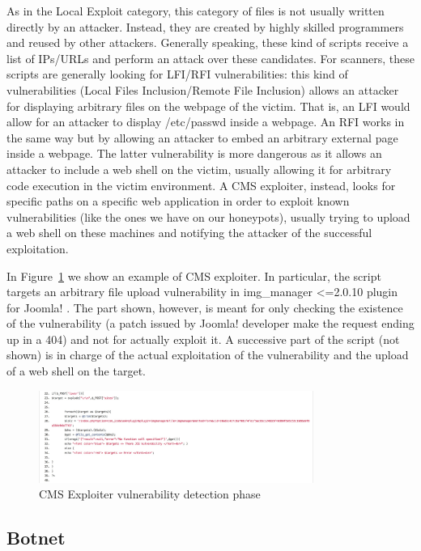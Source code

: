 As in the Local Exploit category, this category of files is not usually written directly by an attacker. Instead, they are created by highly skilled programmers and reused by other attackers. Generally speaking, these kind of scripts receive a list of IPs/URLs and perform an attack over these candidates.
For scanners, these scripts are generally looking for LFI/RFI vulnerabilities: this kind of vulnerabilities (Local Files Inclusion/Remote File Inclusion) allows an attacker for displaying arbitrary files on the webpage of the victim. That is, an LFI would allow for an attacker to display /etc/passwd inside a webpage. An RFI works in the same way but by allowing an attacker to embed an arbitrary external page inside a webpage. The latter vulnerability is more dangerous as it allows an attacker to include a web shell on the victim, usually allowing it for arbitrary code execution in the victim environment.
A CMS exploiter, instead, looks for specific paths on a specific web application in order to exploit known vulnerabilities (like the ones we have on our honeypots), usually trying to upload a web shell on these machines and notifying the attacker of the successful exploitation.

In Figure~\ref{fig:attackerScript} we show an example of CMS exploiter. In particular, the script targets an arbitrary file upload vulnerability in img\_manager <=2.0.10 plugin for Joomla! \cite{joomlaImgManager}. The part shown, however, is meant for only checking the existence of the vulnerability (a patch issued by Joomla! developer make the request ending up in a 404) and not for actually exploit it. A successive part of the script (not shown) is in charge of the actual exploitation of the  vulnerability and the upload of a web shell on the target.

\begin{figure}[H]
\centerline{\includegraphics[width=0.8\textwidth]{Images/attackerScript.jpg}}
\caption{CMS Exploiter vulnerability detection phase\label{fig:attackerScript}}
\end{figure}


\subsection{Botnet}

